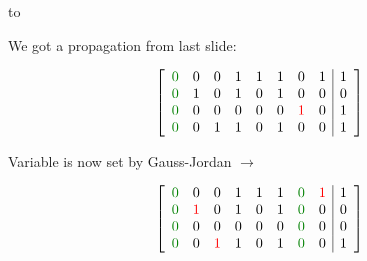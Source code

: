 \documentclass[aspectratio=196]{slides}
\def\TITLE#1{\hbox to \linewidth{\large #1\hfill}}
\def\BOTTOM{\vfill\newpage}
\def\SLIDE#1{\BOTTOM\TITLE{#1}}
\begin{document}
\vfill
\newpage
\SLIDE{CDCL(T) Gauss-Jordan Elimination: Propagation}
\vspace{2ex}

\begin{minipage}{0.2\linewidth}
\centering
We got a propagation from last slide:
\end{minipage}
\begin{minipage}{0.3\linewidth}
\[
\left[
\begin{array}{llllllll|l}
\color{darkgreen}0 &            0 &           0 & 1 & 1 & 1 &            0 & 1 & 1\\
\color{darkgreen}0 & 1 &           0 & 1 & 0 & 1 &            0 &            0 & 0\\
\color{darkgreen}0 &            0 &           0 & 0 & 0 & 0 & \color{red}1 &            0 & 1\\
\color{darkgreen}0 &            0 &1 & 1 & 0 & 1 &            0 &            0 & 1\\
\end{array}
\right]
\]
\end{minipage}
%
\begin{minipage}{0.2\linewidth}
\centering
Variable is now set by Gauss-Jordan $\rightarrow$
\end{minipage}
%
\begin{minipage}{0.3\linewidth}
\[
\left[
\begin{array}{llllllll|l}
\color{darkgreen}0 &            0 &           0 & 1 & 1 & 1 & \color{darkgreen}0 & \color{red}1 & 1\\
\color{darkgreen}0 & \color{red}1 &           0 & 1 & 0 & 1 & \color{darkgreen}0 & 0 & 0\\
\color{darkgreen}0 &            0 &           0 & 0 & 0 & 0 & \color{darkgreen}0 & 0 & 0\\
\color{darkgreen}0 &            0 &\color{red}1 & 1 & 0 & 1 & \color{darkgreen}0 & 0 & 1\\
\end{array}
\right]
\]
\end{minipage}
\end{document}

